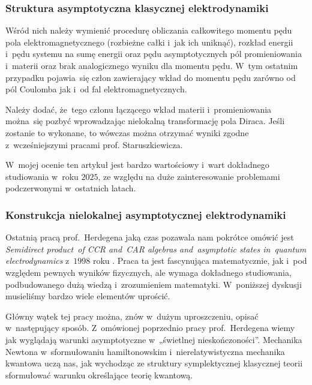 \documentclass[10pt,t]{beamer}
\begin{document}
\begin{frame}
  \frametitle{Struktura asymptotyczna klasycznej elektrodynamiki}


  Wśród nich należy wymienić procedurę obliczania całkowitego momentu pędu
  pola elektromagnetycznego (rozbieżne całki i~jak ich uniknąć), rozkład
  energii i~pędu systemu na sumę energii oraz pędu asymptotycznych pól
  promieniowania i~materii oraz brak analogicznego wyniku dla momentu pędu.
  W~tym ostatnim przypadku pojawia~się człon zawierający wkład do momentu
  pędu zarówno od pól Coulomba jak i~od fal elektromagnetycznych.

  Należy dodać, że~tego członu łączącego wkład materii i~promieniowania
  można~się pozbyć wprowadzając nielokalną transformację pola Diraca. Jeśli
  zostanie to wykonane, to wówczas można otrzymać wyniki zgodne
  z~wcześniejszymi pracami prof. Staruszkiewicza.

  W~mojej ocenie ten artykuł jest bardzo wartościowy i~wart dokładnego
  studiowania w~roku $2025$, ze względu na duże zainteresowanie problemami
  podczerwonymi w~ostatnich latach.

\end{frame}





\begin{frame}
  \frametitle{Konstrukcja nielokalnej asymptotycznej
    elektrodynamiki}


  Ostatnią pracą prof.~Herdegena jaką czas pozawala nam pokrótce omówić
  jest 
  {\textit{Semidirect product~of CCR and~CAR algebras and~asymptotic states
      in~quantum electrodynamics}} z~$1998$ roku
  \parencite{Herdegen-Semidirect-product-of-CCR-and-CAR-algebras-ETC-Pub-1998}.
  Praca ta jest fascynująca matematycznie,
  jak i~pod względem pewnych wyników fizycznych, ale wymaga dokładnego
  studiowania, podbudowanego dużą wiedzą i~zrozumieniem matematyki.
  W~poniższej dyskusji musieliśmy bardzo wiele elementów uprościć.

  Główny wątek tej pracy można, znów w~dużym uproszczeniu, opisać
  w~następujący sposób. Z~omówionej poprzednio pracy prof.~Herdegena
  wiemy jak wyglądają warunki asymptotyczne w~„świetlnej nieskończoności”.
  Mechanika Newtona w~sformułowaniu hamiltonowskim i~nierelatywistyczna
  mechanika kwantowa uczą nas, jak wychodząc ze struktury symplektycznej
  klasycznej teorii sformułować warunku określające teorię kwantową.

\end{frame}
\end{document}
